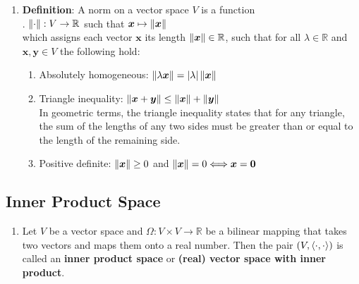 \begin{enumerate}
    \item \textbf{Definition}: A norm on a vector space $V$ is a function
    \hfill \cite{mfml/book/mml/Deisenroth-Faisal-Ong}
    \\
    .\hfill
    $\left\| \cdot \right\|: V \to \mathbb{R}$ such that $\bm{x} \mapsto \left\| \bm{x} \right\|$
    \hfill \cite{mfml/book/mml/Deisenroth-Faisal-Ong}
    \\
    which assigns each vector $\bm{x}$ its length $\left\| \bm{x} \right\| \in \mathbb{R}$, such that for all $\lambda \in \mathbb{R}$ and $\bm{x}, \bm{y} \in V$ the following hold:
    \hfill \cite{mfml/book/mml/Deisenroth-Faisal-Ong}
    \begin{enumerate}
        \item Absolutely homogeneous: $\left\| \lambda \bm{x} \right\| = \left| \lambda \right| \left\| \bm{x} \right\|$
        \hfill \cite{mfml/book/mml/Deisenroth-Faisal-Ong}

        \item Triangle inequality: $\left\| \bm{x} + \bm{y} \right\| \leq \left\| \bm{x} \right\| + \left\| \bm{y} \right\|$
        \hfill \cite{mfml/book/mml/Deisenroth-Faisal-Ong}
        \\
        In geometric terms, the triangle inequality states that for any triangle, the sum of the lengths of any two sides must be greater than or equal to the length of the remaining side.
        

        \item Positive definite: $\left\| \bm{x} \right\| \geq 0$ and $\left\| \bm{x} \right\| = 0 \Longleftrightarrow \bm{x} = \bm{0}$
        \hfill \cite{mfml/book/mml/Deisenroth-Faisal-Ong}
    \end{enumerate}
\end{enumerate}




\subsection{Inner Product Space}

\begin{enumerate}
    \item Let $V$ be a vector space and $\Omega  : V \times  V \to  \mathbb{R}$ be a bilinear mapping that takes two vectors and maps them onto a real number. 
    Then the pair $(V, \langle\cdot, \cdot\rangle)$ is called an \textbf{inner product space} or \textbf{(real) vector space with inner product}.
\end{enumerate}




